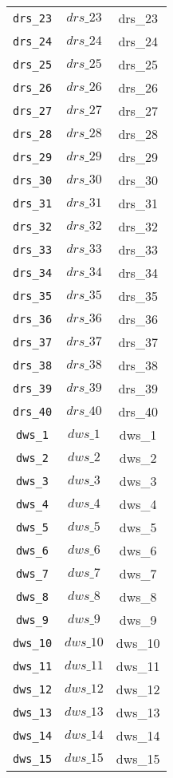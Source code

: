 \begin{center}
\begin{longtable}{ccc}
\texttt{drs\_23} & $drs\_23$ & drs\_23\\
\texttt{drs\_24} & $drs\_24$ & drs\_24\\
\texttt{drs\_25} & $drs\_25$ & drs\_25\\
\texttt{drs\_26} & $drs\_26$ & drs\_26\\
\texttt{drs\_27} & $drs\_27$ & drs\_27\\
\texttt{drs\_28} & $drs\_28$ & drs\_28\\
\texttt{drs\_29} & $drs\_29$ & drs\_29\\
\texttt{drs\_30} & $drs\_30$ & drs\_30\\
\texttt{drs\_31} & $drs\_31$ & drs\_31\\
\texttt{drs\_32} & $drs\_32$ & drs\_32\\
\texttt{drs\_33} & $drs\_33$ & drs\_33\\
\texttt{drs\_34} & $drs\_34$ & drs\_34\\
\texttt{drs\_35} & $drs\_35$ & drs\_35\\
\texttt{drs\_36} & $drs\_36$ & drs\_36\\
\texttt{drs\_37} & $drs\_37$ & drs\_37\\
\texttt{drs\_38} & $drs\_38$ & drs\_38\\
\texttt{drs\_39} & $drs\_39$ & drs\_39\\
\texttt{drs\_40} & $drs\_40$ & drs\_40\\
\texttt{dws\_1} & $dws\_1$ & dws\_1\\
\texttt{dws\_2} & $dws\_2$ & dws\_2\\
\texttt{dws\_3} & $dws\_3$ & dws\_3\\
\texttt{dws\_4} & $dws\_4$ & dws\_4\\
\texttt{dws\_5} & $dws\_5$ & dws\_5\\
\texttt{dws\_6} & $dws\_6$ & dws\_6\\
\texttt{dws\_7} & $dws\_7$ & dws\_7\\
\texttt{dws\_8} & $dws\_8$ & dws\_8\\
\texttt{dws\_9} & $dws\_9$ & dws\_9\\
\texttt{dws\_10} & $dws\_10$ & dws\_10\\
\texttt{dws\_11} & $dws\_11$ & dws\_11\\
\texttt{dws\_12} & $dws\_12$ & dws\_12\\
\texttt{dws\_13} & $dws\_13$ & dws\_13\\
\texttt{dws\_14} & $dws\_14$ & dws\_14\\
\texttt{dws\_15} & $dws\_15$ & dws\_15\\

\end{longtable}
\end{center}
